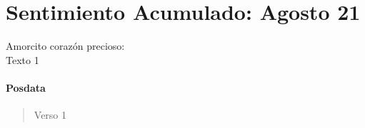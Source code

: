 \section{Sentimiento Acumulado: Agosto 21}
\label{k1}
Amorcito corazón precioso:\\ \newline
Texto 1
\paragraph{Posdata}
\begin{verse}
Verso 1
\end{verse}
